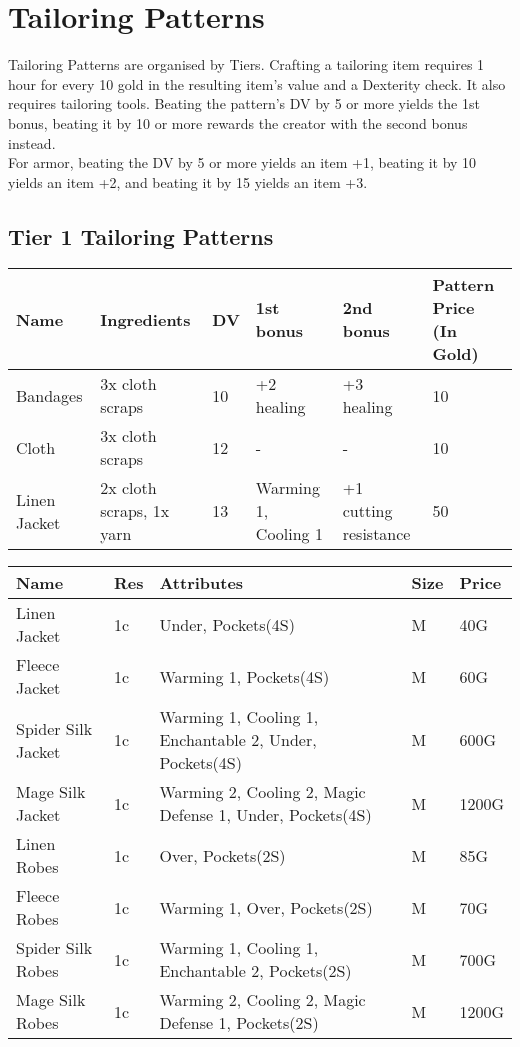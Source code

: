 \section{Tailoring Patterns}\label{sec:tailoringPatterns}
Tailoring Patterns are organised by Tiers.
Crafting a tailoring item requires 1 hour for every 10 gold in the resulting item's value and a Dexterity check.
It also requires tailoring tools.
Beating the pattern's DV by 5 or more yields the 1st bonus, beating it by 10 or more rewards the creator with the second bonus instead.\\
For armor, beating the DV by 5 or more yields an item +1, beating it by 10 yields an item +2, and beating it by 15 yields an item +3.\\
	
\subsection{Tier 1 Tailoring Patterns}
\begin{longtable}{p{1.5cm} | p{2.5cm} | l | p{2cm} | p{2cm} | p{1cm} }
	Name & Ingredients & DV  & 1st bonus & 2nd bonus & Pattern Price (In Gold)\\ \hline
	Bandages & 3x cloth scraps & 10 & +2 healing & +3 healing & 10\\
	Cloth & 3x cloth scraps & 12 & - & - & 10\\
	Linen Jacket & 2x cloth scraps, 1x yarn & 13 & Warming 1, Cooling 1 & +1 cutting resistance & 50\\
\end{longtable}

\begin{longtable}{p{3cm} | p{1.5cm} | p{5cm} | p{1cm} | p{1.5cm}}
	Name & Res &   Attributes & Size & Price\\ \hline

	Linen Jacket & 1c & Under, Pockets(4S) & M & 40G\\

	Fleece Jacket & 1c & Warming 1, Pockets(4S) & M & 60G\\

	Spider Silk Jacket & 1c & Warming 1, Cooling 1, Enchantable 2, Under, Pockets(4S) & M & 600G\\

	Mage Silk Jacket & 1c & Warming 2, Cooling 2, Magic Defense 1, Under, Pockets(4S) & M & 1200G\\

	Linen Robes & 1c & Over, Pockets(2S) & M & 85G\\

	Fleece Robes & 1c & Warming 1, Over, Pockets(2S)  & M & 70G\\

	Spider Silk Robes & 1c & Warming 1, Cooling 1, Enchantable 2, Pockets(2S)  & M & 700G\\

	Mage Silk Robes & 1c & Warming 2, Cooling 2, Magic Defense 1, Pockets(2S)  & M & 1200G\\
\end{longtable}

